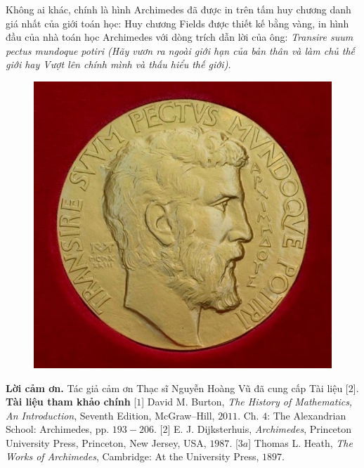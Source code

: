 \begin{multicols}{2}
	\vskip 0.1cm
	Không ai khác, chính là hình Archimedes đã được in trên tấm huy chương danh giá nhất của giới toán học:
	\vskip 0.1cm
	Huy chương Fields được thiết kế bằng vàng, in hình đầu của nhà toán học Archimedes với dòng trích dẫn lời của ông: \textit{Transire suum pectus mundoque potiri (Hãy vươn ra ngoài giới hạn của bản thân và làm chủ thế giới hay Vượt lên chính mình và thấu hiểu thế giới).}
		\begin{figure}[H]
		\vspace*{5pt}
		\centering
		\captionsetup{labelformat= empty, justification=centering}
		\includegraphics[width= 1\linewidth]{10}
		\vspace*{-10pt}
	\end{figure}
	\textbf{\color{lichsutoanhoc}Lời cảm ơn.} Tác giả cảm ơn Thạc sĩ Nguyễn Hoàng Vũ đã cung cấp Tài liệu [$2$].
	\vskip 0.1cm
	\textbf{\color{lichsutoanhoc}Tài liệu tham khảo chính}
	\vskip 0.1cm
	[$1$] David M. Burton, \textit{The History of Mathematics, An Introduction}, Seventh Edition, McGraw--Hill, $2011$. Ch. $4$: The Alexandrian School: Archimedes, pp. $193-206$.
	\vskip 0.1cm
	[$2$] E. J. Dijksterhuis, \textit{Archimedes}, Princeton University Press, Princeton, New Jersey, USA, $1987$. 
	\vskip 0.1cm
	[$3a$] Thomas L. Heath, \textit{The Works of Archimedes}, Cambridge: At the University Press, $1897$.
	\vskip 0.1cm

\end{multicols}
